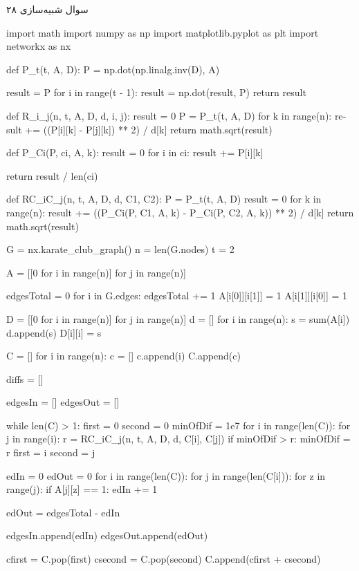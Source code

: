 سوال شبیه‌سازی ۲۸

\begin{latin}
\begin{python}
import math
import numpy as np
import matplotlib.pyplot as plt
import networkx as nx


def P_t(t, A, D):
    P = np.dot(np.linalg.inv(D), A)

    result = P
    for i in range(t - 1):
        result = np.dot(result, P)
    return result


def R_i_j(n, t, A, D, d, i, j):
    result = 0
    P = P_t(t, A, D)
    for k in range(n):
        result += ((P[i][k] - P[j][k]) ** 2) / d[k]
    return math.sqrt(result)


def P_Ci(P, ci, A, k):
    result = 0
    for i in ci:
        result += P[i][k]

    return result / len(ci)


def RC_iC_j(n, t, A, D, d, C1, C2):
    P = P_t(t, A, D)
    result = 0
    for k in range(n):
        result += ((P_Ci(P, C1, A, k) - P_Ci(P, C2, A, k)) ** 2) / d[k]
    return math.sqrt(result)


G = nx.karate_club_graph()
n = len(G.nodes)
t = 2

A = [[0 for i in range(n)] for j in range(n)]

edgesTotal = 0
for i in G.edges:
    edgesTotal += 1
    A[i[0]][i[1]] = 1
    A[i[1]][i[0]] = 1

D = [[0 for i in range(n)] for j in range(n)]
d = []
for i in range(n):
    s = sum(A[i])
    d.append(s)
    D[i][i] = s

C = []
for i in range(n):
    c = []
    c.append(i)
    C.append(c)

diffs = []

edgesIn = []
edgesOut = []

while len(C) > 1:
    first = 0
    second = 0
    minOfDif = 1e7
    for i in range(len(C)):
        for j in range(i):
            r = RC_iC_j(n, t, A, D, d, C[i], C[j])
            if minOfDif > r:
                minOfDif = r
                first = i
                second = j

    edIn = 0
    edOut = 0
    for i in range(len(C)):
        for j in range(len(C[i])):
            for z in range(j):
                if A[j][z] == 1:
                    edIn += 1

    edOut = edgesTotal - edIn

    edgesIn.append(edIn)
    edgesOut.append(edOut)

    cfirst = C.pop(first)
    csecond = C.pop(second)
    C.append(cfirst + csecond)


\end{python}
\end{latin}
